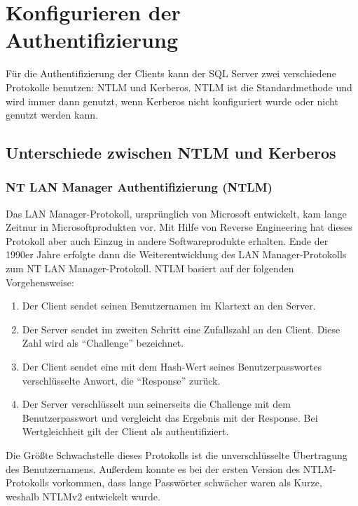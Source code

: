     \section{Konfigurieren der Authentifizierung}
      Für die Authentifizierung der Clients kann der SQL Server zwei
      verschiedene Protokolle benutzen: NTLM und Kerberos. NTLM ist die
      Standardmethode und wird immer dann genutzt, wenn
      Kerberos nicht konfiguriert wurde oder nicht genutzt werden kann.
      \subsection{Unterschiede zwischen NTLM und Kerberos}
        \subsubsection{NT LAN Manager Authentifizierung (NTLM)}
          Das LAN Manager-Protokoll, ursprünglich von Microsoft entwickelt,
          kam lange Zeitnur in Microsoftprodukten vor. Mit Hilfe von
          Reverse Engineering hat dieses Protokoll aber auch Einzug in andere
          Softwareprodukte erhalten. Ende der 1990er Jahre erfolgte dann die
          Weiterentwicklung des LAN Manager-Protokolls zum NT LAN
          Manager-Protokoll. NTLM basiert auf der folgenden Vorgehensweise:
          \begin{enumerate}
            \item Der Client sendet seinen Benutzernamen im Klartext an den
            Server.
            \item Der Server sendet im zweiten Schritt eine Zufallszahl an den
            Client. Diese Zahl wird als \enquote{Challenge} bezeichnet.
            \item Der Client sendet eine mit dem Hash-Wert seines
            Benutzerpasswortes verschlüsselte Anwort, die \enquote{Response}
            zurück.
            \item Der Server verschlüsselt nun seinerseits die Challenge mit dem
            Benutzerpasswort und vergleicht das Ergebnis mit der Response. Bei
            Wertgleichheit gilt der Client als authentifiziert.
          \end{enumerate}
          Die Größte Schwachstelle dieses Protokolls ist die unverschlüsselte
          Übertragung des Benutzernamens. Außerdem konnte es bei der ersten
          Version des NTLM-Protokolls vorkommen, dass lange Passwörter schwächer
          waren als Kurze, weshalb NTLMv2 entwickelt wurde.
